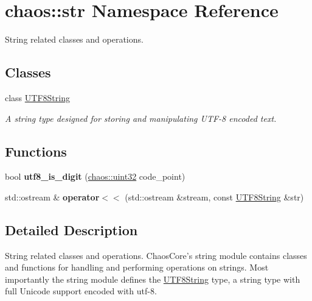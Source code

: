 \hypertarget{namespacechaos_1_1str}{\section{chaos\-:\-:str Namespace Reference}
\label{namespacechaos_1_1str}
}


String related classes and operations.  


\subsection*{Classes}
\begin{DoxyCompactItemize}
\item 
class \hyperlink{classchaos_1_1str_1_1_u_t_f8_string}{U\-T\-F8\-String}
\begin{DoxyCompactList}\small\item\em A string type designed for storing and manipulating U\-T\-F-\/8 encoded text. \end{DoxyCompactList}\end{DoxyCompactItemize}
\subsection*{Functions}
\begin{DoxyCompactItemize}
\item 
\hypertarget{namespacechaos_1_1str_adc9b55515e06b320356d219cb573b20e}{bool {\bfseries utf8\-\_\-is\-\_\-digit} (\hyperlink{namespacechaos_a3b3a47ba1e284655bf1a30c441121c60}{chaos\-::uint32} code\-\_\-point)}\label{namespacechaos_1_1str_adc9b55515e06b320356d219cb573b20e}

\item 
\hypertarget{namespacechaos_1_1str_af8ed01c19bc2b322f36a751694e2dd0c}{std\-::ostream \& {\bfseries operator$<$$<$} (std\-::ostream \&stream, const \hyperlink{classchaos_1_1str_1_1_u_t_f8_string}{U\-T\-F8\-String} \&str)}\label{namespacechaos_1_1str_af8ed01c19bc2b322f36a751694e2dd0c}

\end{DoxyCompactItemize}


\subsection{Detailed Description}
String related classes and operations. Chaos\-Core's string module contains classes and functions for handling and performing operations on strings. Most importantly the string module defines the \hyperlink{classchaos_1_1str_1_1_u_t_f8_string}{U\-T\-F8\-String} type, a string type with full Unicode support encoded with utf-\/8. 